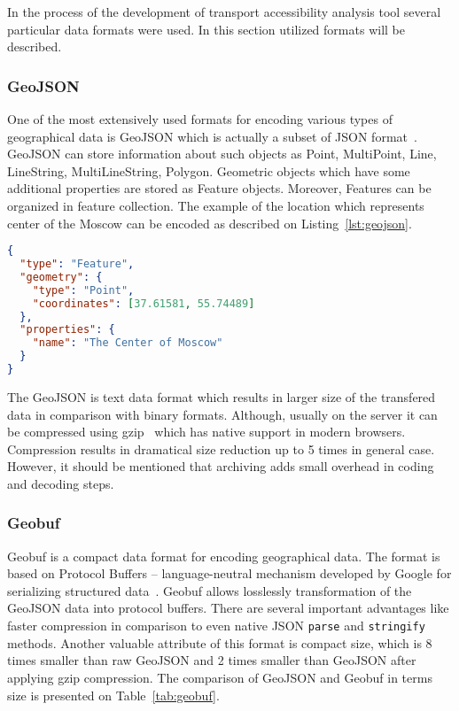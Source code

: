 In the process of the development of transport accessibility analysis tool several
particular data formats were used. In this section utilized formats will be described.

\subsubsection{GeoJSON}

One of the most extensively used formats for encoding various types of geographical data is
GeoJSON which is actually a subset of JSON format~\cite{geojson:spec}. GeoJSON can store information
about such objects as Point, MultiPoint, Line, LineString, MultiLineString, Polygon. Geometric
objects which have some additional properties are stored as Feature objects. Moreover,
Features can be organized in feature collection. The example of the location which
represents center of the Moscow can be encoded as described on Listing~\ref{lst:geojson}.

\begin{lstlisting}[language=json, caption=GeoJSON data example.,
      label={lst:geojson}]
{
  "type": "Feature",
  "geometry": {
    "type": "Point",
    "coordinates": [37.61581, 55.74489]
  },
  "properties": {
    "name": "The Center of Moscow"
  }
}
\end{lstlisting}


The GeoJSON is text data format which results in larger size of the transfered data in comparison
with binary formats. Although, usually on the server it can be compressed using gzip~\cite{gzip}
which has native support in modern browsers. Compression results in dramatical size reduction up to
5 times in general case. However, it should be mentioned that archiving adds small overhead in
coding and decoding steps.

\subsubsection{Geobuf}

Geobuf is a compact data format for encoding geographical data. The format is based on Protocol
Buffers -- language-neutral mechanism developed by Google for serializing structured
data~\cite{protobuf}. Geobuf allows losslessly transformation of the GeoJSON data into protocol
buffers. There are several important advantages like faster compression in comparison to even native
JSON \texttt{parse} and \texttt{stringify} methods. Another valuable attribute of this format is
compact size, which is 8 times smaller than raw GeoJSON and 2 times smaller than GeoJSON after
applying gzip compression. The comparison of GeoJSON and Geobuf in terms size is presented on
Table~\ref{tab:geobuf}.

